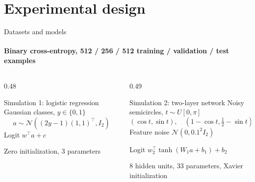 \documentclass[aspectratio=169,xcolor=table]{beamer}
\begin{document}
\section{Experimental design}

\begin{frame}{Datasets and models}
    \framesubtitle{Binary cross-entropy, 512 / 256 / 512 training / validation / test examples}
    \begin{columns}[T,onlytextwidth]
        \begin{column}{0.48\textwidth}
            \begin{block}{Simulation 1: logistic regression}
                Gaussian classes, \(y\in\{0,1\}\)
                \[
                    a\sim\mathcal N((2y-1)(1,1)^\top,I_2)
                \]
                Logit \(w^\top a+c\)

                Zero initialization, 3 parameters
            \end{block}
        \end{column}
        \begin{column}{0.49\textwidth}
            \begin{block}{Simulation 2: two-layer network}
                Noisy semicircles, \(t\sim U[0,\pi]\)
                \[
                    (\cos t,\sin t),\quad (1-\cos t,\tfrac12-\sin t)
                \]
                Feature noise \(\mathcal N(0,0.1^2 I_2)\)

                Logit \(w_2^\top\tanh(W_1 a+b_1)+b_2\)

                8 hidden units, 33 parameters, Xavier initialization
            \end{block}
        \end{column}
    \end{columns}
\end{frame}
\end{document}
